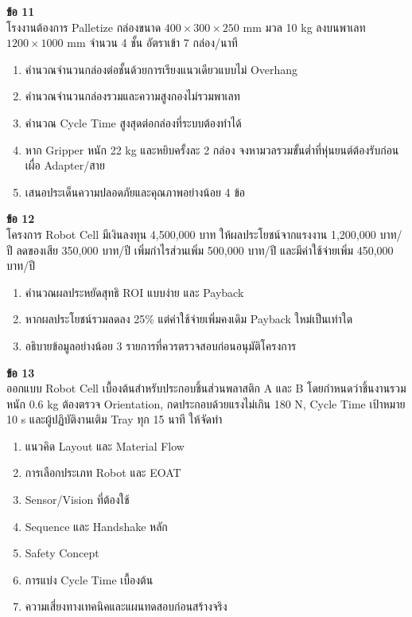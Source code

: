 \textbf{ข้อ 11}\\
โรงงานต้องการ Palletize กล่องขนาด $400\times300\times250$ mm มวล 10 kg ลงบนพาเลท $1200\times1000$ mm จำนวน 4 ชั้น อัตราเข้า 7 กล่อง/นาที

\begin{enumerate}
    \item คำนวณจำนวนกล่องต่อชั้นด้วยการเรียงแนวเดียวแบบไม่ Overhang
    \item คำนวณจำนวนกล่องรวมและความสูงกองไม่รวมพาเลท
    \item คำนวณ Cycle Time สูงสุดต่อกล่องที่ระบบต้องทำได้
    \item หาก Gripper หนัก 22 kg และหยิบครั้งละ 2 กล่อง จงหามวลรวมขั้นต่ำที่หุ่นยนต์ต้องรับก่อนเผื่อ Adapter/สาย
    \item เสนอประเด็นความปลอดภัยและคุณภาพอย่างน้อย 4 ข้อ
\end{enumerate}

\textbf{ข้อ 12}\\
โครงการ Robot Cell มีเงินลงทุน 4,500,000 บาท ให้ผลประโยชน์จากแรงงาน 1,200,000 บาท/ปี ลดของเสีย 350,000 บาท/ปี เพิ่มกำไรส่วนเพิ่ม 500,000 บาท/ปี และมีค่าใช้จ่ายเพิ่ม 450,000 บาท/ปี

\begin{enumerate}
    \item คำนวณผลประหยัดสุทธิ ROI แบบง่าย และ Payback
    \item หากผลประโยชน์รวมลดลง 25\% แต่ค่าใช้จ่ายเพิ่มคงเดิม Payback ใหม่เป็นเท่าใด
    \item อธิบายข้อมูลอย่างน้อย 3 รายการที่ควรตรวจสอบก่อนอนุมัติโครงการ
\end{enumerate}

\textbf{ข้อ 13}\\
ออกแบบ Robot Cell เบื้องต้นสำหรับประกอบชิ้นส่วนพลาสติก A และ B โดยกำหนดว่าชิ้นงานรวมหนัก 0.6 kg ต้องตรวจ Orientation, กดประกอบด้วยแรงไม่เกิน 180 N, Cycle Time เป้าหมาย 10 s และผู้ปฏิบัติงานเติม Tray ทุก 15 นาที ให้จัดทำ

\begin{enumerate}
    \item แนวคิด Layout และ Material Flow
    \item การเลือกประเภท Robot และ EOAT
    \item Sensor/Vision ที่ต้องใช้
    \item Sequence และ Handshake หลัก
    \item Safety Concept
    \item การแบ่ง Cycle Time เบื้องต้น
    \item ความเสี่ยงทางเทคนิคและแผนทดสอบก่อนสร้างจริง
\end{enumerate}


